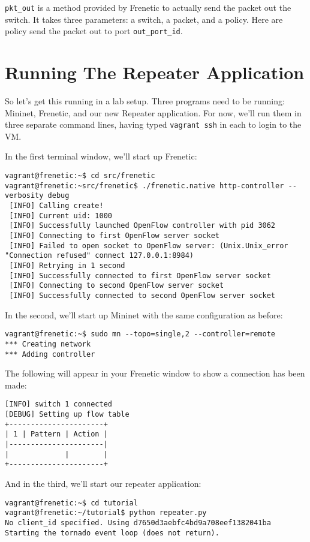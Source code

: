 \lstinline{pkt_out} is a method provided by Frenetic to actually send the packet out the switch.  It takes three 
parameters: a switch, a packet, and a policy.  
Here are policy send the packet out to port \lstinline{out_port_id}.   

\section{Running The Repeater Application}

So let's get this running in a lab setup.  
Three programs need to be running:  Mininet, Frenetic, and our new Repeater application.  
For now, we'll run them in three separate command lines, having typed \lstinline{vagrant ssh} in each
to login to the VM.

In the first terminal window, we'll start up Frenetic:
\\
\begin{lstlisting}[style=BashInputStyle]
vagrant@frenetic:~$ cd src/frenetic
vagrant@frenetic:~src/frenetic$ ./frenetic.native http-controller --verbosity debug
 [INFO] Calling create!
 [INFO] Current uid: 1000
 [INFO] Successfully launched OpenFlow controller with pid 3062
 [INFO] Connecting to first OpenFlow server socket
 [INFO] Failed to open socket to OpenFlow server: (Unix.Unix_error "Connection refused" connect 127.0.0.1:8984)
 [INFO] Retrying in 1 second
 [INFO] Successfully connected to first OpenFlow server socket
 [INFO] Connecting to second OpenFlow server socket
 [INFO] Successfully connected to second OpenFlow server socket 
\end{lstlisting}

In the second, we'll start up Mininet with the same configuration as before:
\\
\begin{lstlisting}[style=BashInputStyle]
vagrant@frenetic:~$ sudo mn --topo=single,2 --controller=remote
*** Creating network
*** Adding controller
\end{lstlisting}

The following will appear in your Frenetic window to show a connection has been made:
\\
\begin{lstlisting}[style=BashInputStyle]
 [INFO] switch 1 connected
[DEBUG] Setting up flow table
+----------------------+
| 1 | Pattern | Action |
|----------------------|
|             |        |
+----------------------+
\end{lstlisting}

And in the third, we'll start our repeater application:
\\
\begin{lstlisting}[style=BashInputStyle]vagrant@frenetic:~$ cd tutorial
vagrant@frenetic:~/tutorial$ python repeater.py
No client_id specified. Using d7650d3aebfc4bd9a708eef1382041ba
Starting the tornado event loop (does not return).
\end{lstlisting}

